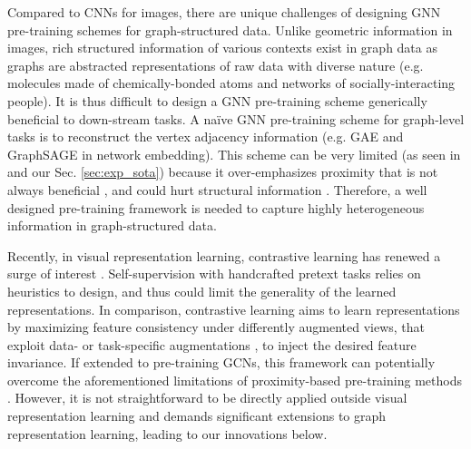 Compared to CNNs for images, there are unique challenges of designing GNN pre-training schemes for graph-structured data.  Unlike geometric information in images, rich structured information of various contexts exist in graph data \cite{velivckovic2018deep,sun2019infograph} %
as graphs are abstracted representations of raw data with diverse nature (e.g. molecules made of chemically-bonded atoms and networks of socially-interacting people).  It is thus difficult to design a GNN pre-training scheme generically beneficial to down-stream tasks. A na\"ive GNN pre-training scheme for graph-level tasks is to reconstruct the vertex adjacency information (e.g. GAE \cite{kipf2016variational} and GraphSAGE \cite{hamilton2017inductive} in network embedding).  This scheme can be very limited (as seen in \cite{velivckovic2018deep} and our Sec. \ref{sec:exp_sota}) because it over-emphasizes proximity that is not always beneficial \cite{velivckovic2018deep}, and could hurt structural information \cite{ribeiro2017struc2vec}. Therefore, a well designed pre-training framework is needed to capture highly heterogeneous information in graph-structured data.%

Recently, in visual representation learning, contrastive learning has renewed a surge of interest \cite{wu2018unsupervised,ye2019unsupervised,ji2019invariant,chen2020simple,he2020momentum}. Self-supervision with handcrafted pretext tasks \cite{noroozi2016unsupervised,carlucci2019domain,trinh2019selfie,chen2020adversarial} relies on heuristics to design, and thus could limit the generality of the learned representations. In comparison, contrastive learning aims to learn representations by maximizing feature consistency under differently augmented views, that exploit data- or task-specific augmentations \cite{herzig2019learning}, to inject the desired feature invariance. 
If extended to pre-training GCNs, this framework can potentially  overcome the aforementioned limitations of proximity-based pre-training methods \cite{kipf2016variational,hamilton2017inductive,you2020does,jin2020self,zhu2020self,zhang2020graph,hu2020gpt,liu2020self}. However, it is not straightforward to be directly applied outside visual representation learning and demands significant extensions to graph representation learning, leading to our innovations below.   


